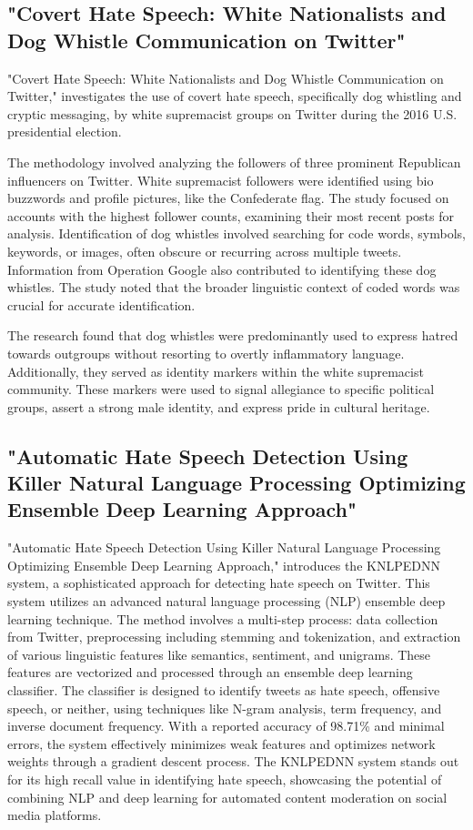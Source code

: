 \documentclass[11pt]{article}
\begin{document}
\subsection{"Covert Hate Speech: White Nationalists and Dog Whistle Communication on Twitter"}
"Covert Hate Speech: White Nationalists and Dog Whistle Communication on Twitter," \cite{bhat2020covert} investigates the use of covert hate speech, specifically dog whistling and cryptic messaging, by white supremacist groups on Twitter during the 2016 U.S. presidential election.

The methodology involved analyzing the followers of three prominent Republican influencers on Twitter. White supremacist followers were identified using bio buzzwords and profile pictures, like the Confederate flag. The study focused on accounts with the highest follower counts, examining their most recent posts for analysis. Identification of dog whistles involved searching for code words, symbols, keywords, or images, often obscure or recurring across multiple tweets. Information from Operation Google also contributed to identifying these dog whistles. The study noted that the broader linguistic context of coded words was crucial for accurate identification.

The research found that dog whistles were predominantly used to express hatred towards outgroups without resorting to overtly inflammatory language. Additionally, they served as identity markers within the white supremacist community. These markers were used to signal allegiance to specific political groups, assert a strong male identity, and express pride in cultural heritage.


\subsection{"Automatic Hate Speech Detection Using Killer Natural Language Processing Optimizing Ensemble Deep Learning Approach"}
"Automatic Hate Speech Detection Using Killer Natural Language Processing Optimizing Ensemble Deep Learning Approach," \cite{almakhadmeh2020automatic} introduces the KNLPEDNN system, a sophisticated approach for detecting hate speech on Twitter. This system utilizes an advanced natural language processing (NLP) ensemble deep learning technique. The method involves a multi-step process: data collection from Twitter, preprocessing including stemming and tokenization, and extraction of various linguistic features like semantics, sentiment, and unigrams. These features are vectorized and processed through an ensemble deep learning classifier. The classifier is designed to identify tweets as hate speech, offensive speech, or neither, using techniques like N-gram analysis, term frequency, and inverse document frequency. With a reported accuracy of 98.71\% and minimal errors, the system effectively minimizes weak features and optimizes network weights through a gradient descent process. The KNLPEDNN system stands out for its high recall value in identifying hate speech, showcasing the potential of combining NLP and deep learning for automated content moderation on social media platforms.
\end{document}
